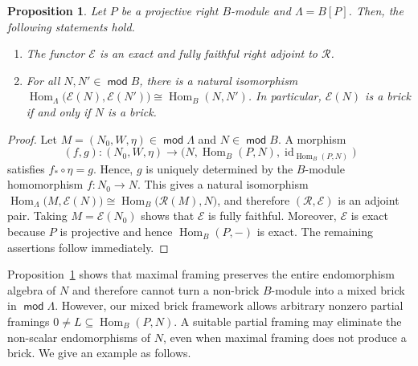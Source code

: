 \documentclass[a4,12pt]{amsart}
\numberwithin{equation}{section} %
\def\Hom{\operatorname{Hom}} %
\def\mod{\operatorname{\mathsf{mod}}}
\newtheorem{proposition}[theorem]{Proposition} %
\theoremstyle{definition} %
\begin{document}
\begin{proposition}\label{prop:max-framing}
Let $P$ be a projective right $B$-module and $\Lambda=B[P]$.
Then, the following statements hold.
\begin{enumerate}
\item The functor $\mathcal{E}$ is an exact and fully faithful right
adjoint to $\mathcal{R}$.

\item For all $N,N'\in\mod B$, there is a natural isomorphism $\Hom_\Lambda\bigl(\mathcal{E}(N),\mathcal{E}(N')\bigr) \cong \Hom_B(N,N')$. In particular, $\mathcal{E}(N)$ is a brick if and only if $N$ is a brick.
\end{enumerate}
\end{proposition}
\begin{proof}
Let $M=(N_0,W,\eta)\in\mod \Lambda$ and $N\in\mod B$. A morphism
\[
(f,g)\colon
(N_0,W,\eta)
\longrightarrow
\bigl(N,\Hom_B(P,N),\operatorname{id}_{\Hom_B(P,N)}\bigr)
\]
satisfies $f_*\circ\eta=g$. Hence, $g$ is uniquely determined by the $B$-module homomorphism $f\colon N_0\to N$. This gives a natural isomorphism $\Hom_\Lambda\bigl(M,\mathcal{E}(N)\bigr) \cong \Hom_B\bigl(\mathcal{R}(M),N\bigr)$, and therefore $(\mathcal{R},\mathcal{E})$ is an adjoint pair. Taking $M=\mathcal{E}(N_0)$ shows that $\mathcal{E}$ is fully faithful. Moreover, $\mathcal{E}$ is exact because $P$ is projective and hence $\Hom_B(P,-)$ is exact. The remaining assertions follow immediately.
\end{proof}

Proposition~\ref{prop:max-framing} shows that maximal framing preserves the entire endomorphism algebra of $N$ and therefore cannot turn a non-brick $B$-module into a mixed brick in $\mod \Lambda$. However, our mixed brick framework allows arbitrary nonzero partial framings $0\neq L\subseteq\Hom_B(P,N)$. A suitable partial framing may eliminate the non-scalar endomorphisms of $N$, even when maximal framing does not produce a brick. We give an example as follows.
\end{document}
